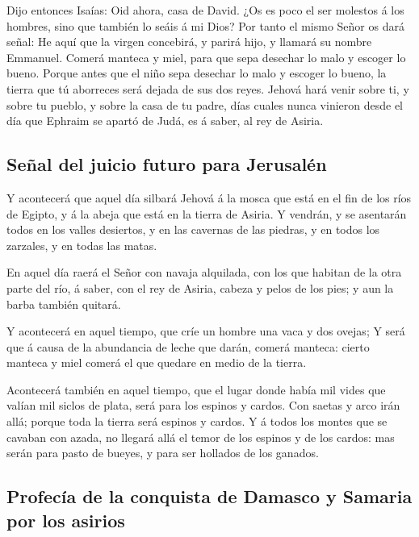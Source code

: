  Dijo entonces Isaías: Oid ahora, casa de David. ¿Os es
poco el ser molestos á los hombres, sino que también lo seáis á mi Dios?
 Por tanto el mismo Señor os dará señal: He aquí que la
virgen concebirá, y parirá hijo, y llamará su nombre Emmanuel.
 Comerá manteca y miel, para que sepa desechar lo malo y
escoger lo bueno.  Porque antes que el niño sepa desechar
lo malo y escoger lo bueno, la tierra que tú aborreces será dejada de
sus dos reyes.  Jehová hará venir sobre ti, y sobre tu
pueblo, y sobre la casa de tu padre, días cuales nunca vinieron desde el
día que Ephraim se apartó de Judá, es á saber, al rey de Asiria.

\hypertarget{seuxf1al-del-juicio-futuro-para-jerusaluxe9n}{%
\subsection{Señal del juicio futuro para
Jerusalén}\label{seuxf1al-del-juicio-futuro-para-jerusaluxe9n}}

 Y acontecerá que aquel día silbará Jehová á la mosca que
está en el fin de los ríos de Egipto, y á la abeja que está en la tierra
de Asiria.  Y vendrán, y se asentarán todos en los valles
desiertos, y en las cavernas de las piedras, y en todos los zarzales, y
en todas las matas.

 En aquel día raerá el Señor con navaja alquilada, con
los que habitan de la otra parte del río, á saber, con el rey de Asiria,
cabeza y pelos de los pies; y aun la barba también quitará.

 Y acontecerá en aquel tiempo, que críe un hombre una
vaca y dos ovejas;  Y será que á causa de la abundancia
de leche que darán, comerá manteca: cierto manteca y miel comerá el que
quedare en medio de la tierra.

 Acontecerá también en aquel tiempo, que el lugar donde
había mil vides que valían mil siclos de plata, será para los espinos y
cardos.  Con saetas y arco irán allá; porque toda la
tierra será espinos y cardos.  Y á todos los montes que
se cavaban con azada, no llegará allá el temor de los espinos y de los
cardos: mas serán para pasto de bueyes, y para ser hollados de los
ganados.

\hypertarget{profecuxeda-de-la-conquista-de-damasco-y-samaria-por-los-asirios}{%
\subsection{Profecía de la conquista de Damasco y Samaria por los
asirios}\label{profecuxeda-de-la-conquista-de-damasco-y-samaria-por-los-asirios}}

